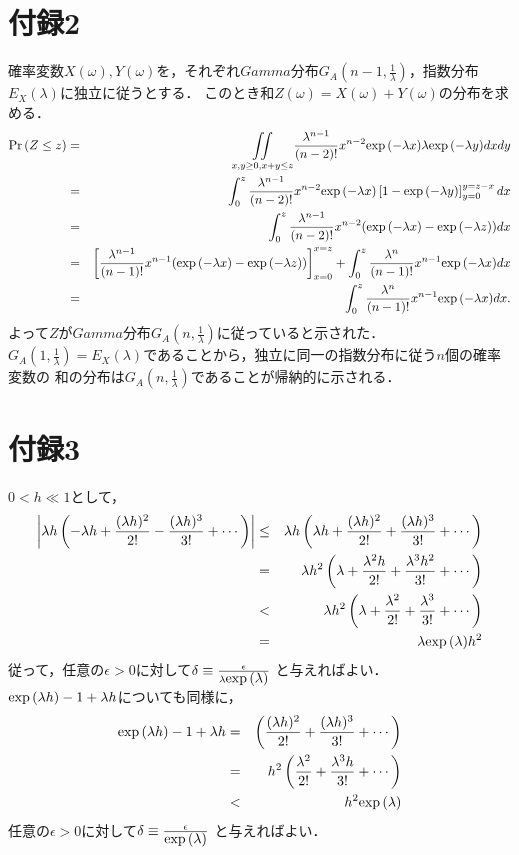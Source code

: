 \documentclass[a4j,papersize,disablejfam,slide,14pt]{jsarticle}
\def\exp#1{\mbox{${\rm exp} \left( #1 \right)$}} %
\def\prob#1{\mbox{${\rm Pr} \left( #1 \right)$}} %
\begin{document}
\newpage
\section{付録2}
	確率変数$X(\omega),Y(\omega)$を，それぞれ$Gamma$分布$G_A(n-1, \frac{1}{\lambda})$，指数分布$E_X(\lambda)$に独立に従うとする．
    このとき和$Z(\omega) = X(\omega) + Y(\omega)$の分布を求める．
    \begin{eqnarray}
    	\prob{Z \leq z} &=& \underset{x,y \geq 0, x + y \leq z}{\iint} \frac{\lambda^{n-1}}{(n-2)!}x^{n-2}\exp{-\lambda x} \lambda \exp{-\lambda y} dxdy \\
        &=& \int_{0}^{z} \frac{\lambda^{n-1}}{(n-2)!}x^{n-2}\exp{-\lambda x} \left[ 1 - \exp{-\lambda y} \right]_{y=0}^{y = z - x} dx \\
        &=& \int_{0}^{z} \frac{\lambda^{n-1}}{(n-2)!}x^{n-2}(\exp{-\lambda x} - \exp{-\lambda z}) dx \\
        &=& \left[ \frac{\lambda^{n-1}}{(n-1)!}x^{n-1}(\exp{-\lambda x} - \exp{-\lambda z}) \right]_{x=0}^{x=z} + \int_{0}^{z} \frac{\lambda^n}{(n-1)!}x^{n-1}\exp{-\lambda x} dx \\
        &=& \int_{0}^{z} \frac{\lambda^n}{(n-1)!}x^{n-1}\exp{-\lambda x} dx.
    \end{eqnarray}
    よって$Z$が$Gamma$分布$G_A(n, \frac{1}{\lambda})$に従っていると示された．$G_A(1, \frac{1}{\lambda}) = E_X(\lambda)$であることから，独立に同一の指数分布に従う$n$個の確率変数の
    和の分布は$G_A(n, \frac{1}{\lambda})$であることが帰納的に示される．

\newpage
\section{付録3}
	$0 < h \ll 1$として，
    \begin{eqnarray}
    	\left| \lambda h \left(- \lambda h + \frac{(\lambda h)^2}{2!} - \frac{(\lambda h)^3}{3!} + \cdots \right) \right|
        &\leq& \lambda h \left(\lambda h + \frac{(\lambda h)^2}{2!} + \frac{(\lambda h)^3}{3!} + \cdots \right) \\
        &=& \lambda h^2 \left(\lambda + \frac{\lambda^2 h}{2!} + \frac{\lambda^3 h^2}{3!} + \cdots \right) \\
        &<& \lambda h^2 \left(\lambda + \frac{\lambda^2}{2!} + \frac{\lambda^3}{3!} + \cdots \right) \\
        &=& \lambda \exp{\lambda} h^2
    \end{eqnarray}
    従って，任意の$\epsilon > 0$に対して$\delta \equiv \frac{\epsilon}{\lambda \exp{\lambda}}$ と与えればよい．\\
    $\exp{\lambda h} - 1 + \lambda h$についても同様に，
    \begin{eqnarray}
    	\exp{\lambda h} - 1 + \lambda h &=& \left(\frac{(\lambda h)^2}{2!} + \frac{(\lambda h)^3}{3!} + \cdots \right) \\
        &=& h^2 \left(\frac{\lambda^2}{2!} + \frac{\lambda^3 h}{3!} + \cdots \right) \\
        &<& h^2 \exp{\lambda}
    \end{eqnarray}
    任意の$\epsilon > 0$に対して$\delta \equiv \frac{\epsilon}{\exp{\lambda}}$ と与えればよい．
\end{document}

